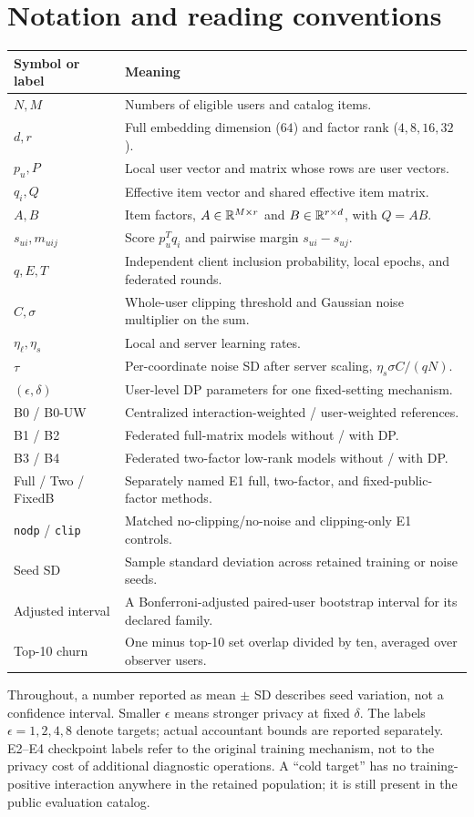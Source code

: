 \section*{Notation and reading conventions}
\begin{longtable}{L{.16\linewidth}L{.77\linewidth}}
\toprule Symbol or label & Meaning \\
\midrule\endhead
$N,M$ & Numbers of eligible users and catalog items. \\
$d,r$ & Full embedding dimension ($64$) and factor rank ($4,8,16,32$). \\
$p_u,P$ & Local user vector and matrix whose rows are user vectors. \\
$q_i,Q$ & Effective item vector and shared effective item matrix. \\
$A,B$ & Item factors, $A\in\mathbb{R}^{M\times r}$ and $B\in\mathbb{R}^{r\times d}$, with $Q=AB$. \\
$s_{ui},m_{uij}$ & Score $p_u^Tq_i$ and pairwise margin $s_{ui}-s_{uj}$. \\
$q,E,T$ & Independent client inclusion probability, local epochs, and federated rounds. \\
$C,\sigma$ & Whole-user clipping threshold and Gaussian noise multiplier on the sum. \\
$\eta_\ell,\eta_s$ & Local and server learning rates. \\
$\tau$ & Per-coordinate noise SD after server scaling, $\eta_s\sigma C/(qN)$. \\
$(\epsilon,\delta)$ & User-level DP parameters for one fixed-setting mechanism. \\
B0 / B0-UW & Centralized interaction-weighted / user-weighted references. \\
B1 / B2 & Federated full-matrix models without / with DP. \\
B3 / B4 & Federated two-factor low-rank models without / with DP. \\
Full / Two / FixedB & Separately named E1 full, two-factor, and fixed-public-factor methods. \\
\texttt{nodp} / \texttt{clip} & Matched no-clipping/no-noise and clipping-only E1 controls. \\
Seed SD & Sample standard deviation across retained training or noise seeds. \\
Adjusted interval & A Bonferroni-adjusted paired-user bootstrap interval for its declared family. \\
Top-10 churn & One minus top-10 set overlap divided by ten, averaged over observer users. \\
\bottomrule
\end{longtable}
Throughout, a number reported as mean $\pm$ SD describes seed variation, not a
confidence interval. Smaller $\epsilon$ means stronger privacy at fixed $\delta$.
The labels $\epsilon=1,2,4,8$ denote targets; actual accountant bounds are reported
separately. E2--E4 checkpoint labels refer to the original training mechanism,
not to the privacy cost of additional diagnostic operations. A ``cold target''
has no training-positive interaction anywhere in the retained population; it
is still present in the public evaluation catalog.
